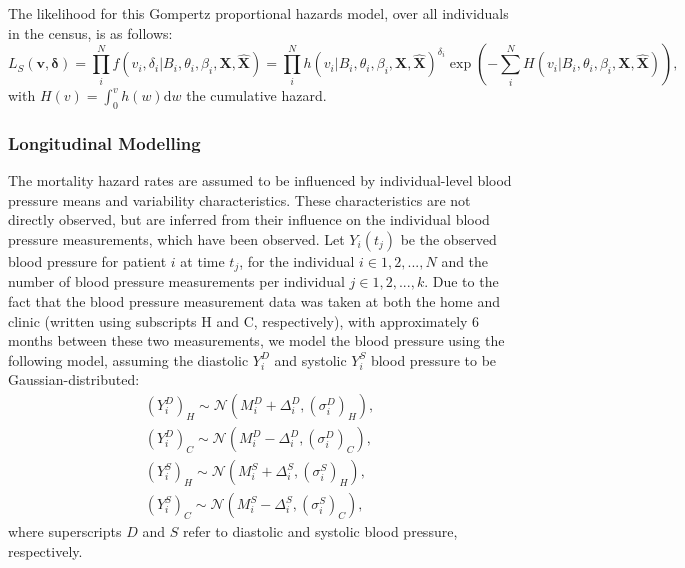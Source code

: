 \documentclass[
]{article}
\begin{document}
The likelihood for this Gompertz proportional hazards model, over all individuals in the census, is as follows:
\begin{equation}\label{likesurv}
L_S(\boldsymbol{v},\boldsymbol{\delta})=\prod_i^N f(v_i,\delta_i|B_i,\theta_i,\beta_i,\boldsymbol{X},\hat{\boldsymbol{X}})=\prod_i^N h(v_i|B_i,\theta_i,\beta_i,\boldsymbol{X},\hat{\boldsymbol{X}})^{\delta_i} \exp{\left( -\sum_i^N H(v_i|B_i,\theta_i,\beta_i,\boldsymbol{X},\hat{\boldsymbol{X}}) \right)},
\end{equation}
with \(H(v)=\int_0^v h(w) \mathrm{d}w\) the cumulative hazard.

\hypertarget{longitudinal-modelling}{%
\subsubsection{Longitudinal Modelling}\label{longitudinal-modelling}}

The mortality hazard rates are assumed to be influenced by individual-level blood pressure means and variability characteristics.
These characteristics are not directly observed, but are inferred from their influence on the individual blood pressure measurements, which have been observed.
Let \(Y_i(t_j)\) be the observed blood pressure for patient \(i\) at time \(t_j\), for the individual \(i\in 1,2,...,N\) and the number of blood pressure measurements per individual \(j\in 1,2,...,k\). Due to the fact that the blood pressure measurement data was taken at both the home and clinic (written using subscripts H and C, respectively), with approximately 6 months between these two measurements, we model the blood pressure using the following model, assuming the diastolic \(Y_{i}^D\) and systolic \(Y_{i}^S\) blood pressure to be Gaussian-distributed:
\begin{equation}\label{bp}
\begin{aligned}
  (Y_{i}^D)_{H} \sim \mathcal{N}(M_i^D+\Delta_i^D,(\sigma_i^D)_H),\\
  (Y_{i}^D)_{C} \sim \mathcal{N}(M_i^D-\Delta_i^D,(\sigma_i^D)_C),\\
  (Y_{i}^S)_{H} \sim \mathcal{N}(M_i^S+\Delta_i^S,(\sigma_i^S)_H),\\
  (Y_{i}^S)_{C} \sim \mathcal{N}(M_i^S-\Delta_i^S,(\sigma_i^S)_C),
\end{aligned}
\end{equation}
where superscripts \(D\) and \(S\) refer to diastolic and systolic blood pressure, respectively.
\end{document}
